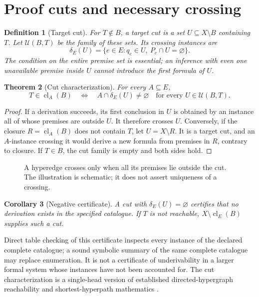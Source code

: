 \documentclass[11pt]{article}
\newtheorem{theorem}{Theorem}[section]
\newtheorem{corollary}[theorem]{Corollary}
\newtheorem{definition}[theorem]{Definition}
\theoremstyle{remark}\newtheorem{remark}[theorem]{Remark}
\newcommand{\cl}{\operatorname{cl}}
\newcommand{\cU}{\mathcal U}
\begin{document}
\section{Proof cuts and necessary crossing}
\begin{definition}[Target cut]
For $T\notin B$, a target cut is a set $U\subseteq X\setminus B$ containing $T$. Let $\cU(B,T)$ be the family of these sets. Its crossing instances are
\[
\delta_E(U)=\{e\in E:q_e\in U,\ P_e\cap U=\varnothing\}.
\]
The condition on the entire premise set is essential; an inference with even one unavailable premise inside $U$ cannot introduce the first formula of $U$.
\end{definition}
\begin{theorem}[Cut characterization]\label{thm:cut}
For every $A\subseteq E$,
\[
T\in\cl_A(B)\quad\Longleftrightarrow\quad
A\cap\delta_E(U)\ne\varnothing\quad\text{for every }U\in\cU(B,T).
\]
\end{theorem}
\begin{proof}
If a derivation succeeds, its first conclusion in $U$ is obtained by an instance all of whose premises are outside $U$. It therefore crosses $U$. Conversely, if the closure $R=\cl_A(B)$ does not contain $T$, let $U=X\setminus R$. It is a target cut, and an $A$-instance crossing it would derive a new formula from premises in $R$, contrary to closure. If $T\in B$, the cut family is empty and both sides hold.
\end{proof}
\begin{figure}[ht]
\centering
{}
\caption{A hyperedge crosses only when all its premises lie outside the cut. The illustration is schematic; it does not assert uniqueness of a crossing.}
\end{figure}
\begin{corollary}[Negative certificate]
A cut with $\delta_E(U)=\varnothing$ certifies that no derivation exists in the specified catalogue. If $T$ is not reachable, $X\setminus\cl_E(B)$ supplies such a cut.
\end{corollary}
Direct table checking of this certificate inspects every instance of the declared complete catalogue; a sound symbolic summary of the same complete catalogue may replace enumeration. It is not a certificate of underivability in a larger formal system whose instances have not been accounted for. The cut characterization is a single-head version of established directed-hypergraph reachability and shortest-hyperpath mathematics \cite{survey,krieger}.
\end{document}
